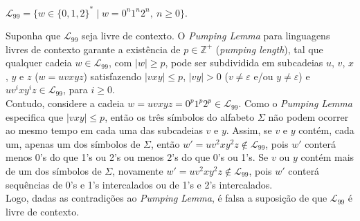 \documentclass[12pt]{article}
\def\discente{Fulana(o) de tal}
\def\matricula{20010101}
\def\myling{{99}} %
\begin{document}
%
\begin{tcolorbox}[rounded corners, colback=yellow!5, colframe=red!40!black, title={\discente\ (\matricula)}]
 $\mathcal{L}_{\myling} = \{w\in\{0,1,2\}^*\mid w = 0^n1^n2^n,\ n \geqslant 0\}$.
\end{tcolorbox}
\begin{tcolorbox}[rounded corners, breakable, colback=yellow!5, colframe=red!40!black, title={A linguagem $\mathcal{L}_{\myling}$ não é livre de contexto.}]
Suponha que $\mathcal{L}_{\myling}$ seja livre de contexto. O \emph{Pumping Lemma} para linguagens livres de contexto garante a existência de $p\in\mathbb{Z}^+$ (\emph{pumping length}), tal que qualquer cadeia $w\in \mathcal{L}_{\myling}$, com $|w|\geqslant p$, pode ser subdividida em subcadeias $u$, $v$, $x$, $y$ e $z$ ($w=uvxyz$) satisfazendo $|vxy|\leqslant p$, $|vy|>0$ ($v\neq\varepsilon$ e/ou $y\neq\varepsilon$) e $uv^ixy^iz\in \mathcal{L}_{\myling}$, para $i\geqslant 0$.\\[10pt]
Contudo, considere a cadeia $w=uvxyz=0^p1^p2^p\in \mathcal{L}_{\myling}$. Como o \emph{Pumping Lemma} especifica que $|vxy|\leqslant p$, então os três símbolos do alfabeto $\Sigma$ não podem ocorrer ao mesmo tempo em cada uma das subcadeias $v$ e $y$. Assim, se $v$ e $y$ contém, cada um, apenas um dos símbolos de $\Sigma$, então $w'=uv^2xy^2z\notin \mathcal{L}_{\myling}$, pois $w'$ conterá menos 0's do que 1's ou 2's ou menos 2's do que 0's ou 1's. Se $v$ ou $y$ contém mais de um dos símbolos de $\Sigma$, novamente $w'=uv^2xy^2z\notin \mathcal{L}_{\myling}$, pois $w'$ conterá sequências de 0's e 1's intercalados ou de 1's e 2's intercalados.\\[10pt]
 Logo, dadas as contradições ao \emph{Pumping Lemma}, é falsa a suposição de que $\mathcal{L}_{\myling}$ é livre de contexto.
\end{tcolorbox}
\end{document}
